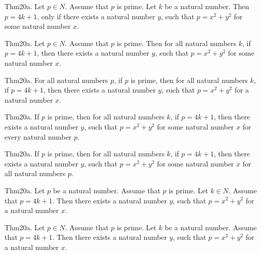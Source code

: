 \documentclass{article}
\begin{document}
Thm20a. Let $p \in N$. Assume that $p$ is prime. Let $k$ be a natural number. Then $p = 4 k + 1$, only if there exists a natural number $y$, such that $p = x ^{ 2}+ y ^{ 2}$ for some natural number $x$.

Thm20a. Let $p \in N$. Assume that $p$ is prime. Then for all natural numbers $k$, if $p = 4 k + 1$, then there exists a natural number $y$, such that $p = x ^{ 2}+ y ^{ 2}$ for some natural number $x$.

Thm20a. For all natural numbers $p$, if $p$ is prime, then for all natural numbers $k$, if $p = 4 k + 1$, then there exists a natural number $y$, such that $p = x ^{ 2}+ y ^{ 2}$ for a natural number $x$.

Thm20a. If $p$ is prime, then for all natural numbers $k$, if $p = 4 k + 1$, then there exists a natural number $y$, such that $p = x ^{ 2}+ y ^{ 2}$ for some natural number $x$ for every natural number $p$.

Thm20a. If $p$ is prime, then for all natural numbers $k$, if $p = 4 k + 1$, then there exists a natural number $y$, such that $p = x ^{ 2}+ y ^{ 2}$ for some natural number $x$ for all natural numbers $p$.

Thm20a. Let $p$ be a natural number. Assume that $p$ is prime. Let $k \in N$. Assume that $p = 4 k + 1$. Then there exists a natural number $y$, such that $p = x ^{ 2}+ y ^{ 2}$ for a natural number $x$.

Thm20a. Let $p \in N$. Assume that $p$ is prime. Let $k$ be a natural number. Assume that $p = 4 k + 1$. Then there exists a natural number $y$, such that $p = x ^{ 2}+ y ^{ 2}$ for a natural number $x$.
\end{document}
